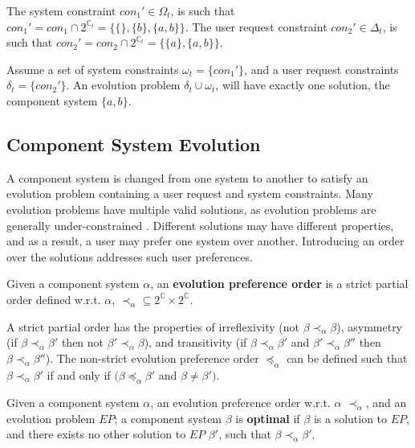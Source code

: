 The system constraint $con_1' \in \Omega_{t}$, is such that $con_1' = con_1 \cap 2^{\mathbb{C}_{t}} = \{\{\},\{b\},\{a,b\}\}$.
The user request constraint $con_2' \in \Delta_{t}$, is such that $con_2' = con_2 \cap 2^{\mathbb{C}_{t}} = \{\{a\},\{a,b\}\}$.

Assume a set of system constraints $\omega_{t} = \{con_1'\}$, and a user request constraints $\delta_{t} = \{con_2'\}$.
An evolution problem $\delta_{t} \cup \omega_{t}$, will have exactly one solution, the component system $\{a,b\}$.  

\subsection{Component System Evolution}
\label{formal.evo}
A component system is changed from one system to another to satisfy an evolution problem containing a user request and system constraints.
Many evolution problems have multiple valid solutions, as evolution problems are generally under-constrained \citep{Berre2008}.
Different solutions may have different properties,
and as a result, a user may prefer one system over another.
Introducing an order over the solutions addresses such user preferences.  

\begin{defs}
Given a component system $\alpha$, an \textbf{evolution preference order} is a strict partial order defined w.r.t. $\alpha$,  $\prec_{\alpha} \subseteq 2^{\mathbb{C}} \times 2^{\mathbb{C}}$.
\end{defs}
A strict partial order has the properties of irreflexivity (not $\beta \prec_{\alpha} \beta$), asymmetry (if $\beta \prec_{\alpha} \beta'$ then not $\beta' \prec_{\alpha} \beta$), 
and transitivity (if $\beta \prec_{\alpha} \beta'$ and $\beta' \prec_{\alpha} \beta''$ then $\beta \prec_{\alpha} \beta''$).
The non-strict evolution preference order $\preceq_{\alpha}$ can be defined such that $\beta \prec_{\alpha} \beta'$ if and only if $(\beta \preceq_{\alpha} \beta'$ and $\beta \neq \beta')$. 

\begin{defs}
Given a component system $\alpha$, an evolution preference order w.r.t. $\alpha$ $\prec_{\alpha}$, and an evolution problem $EP$;
a component system $\beta$ is \textbf{optimal} if $\beta$ is a solution to $EP$, and there exists no other solution to $EP$ $\beta'$, such that $\beta \prec_{\alpha} \beta'$.   
\end{defs}

